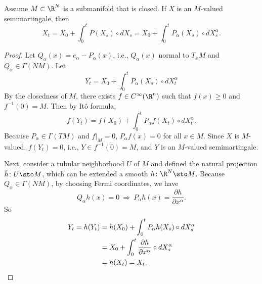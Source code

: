 \begin{lem}
    Assume $M \subset \R^N$ is a submanifold that is closed. If $X$ is an $M$-valued semimartingale, then
    \begin{equation*}
        X_t = X_0 + \int_0^t P(X_s) \circ dX_s = X_0 + \int_0^t P_\alpha(X_s) \circ dX^\alpha_s.
    \end{equation*}
\end{lem}
\begin{proof}
    Let $Q_\alpha(x) = e_\alpha - P_\alpha(x)$, i.e., $Q_\alpha(x)$ normal to $T_xM$ and $Q_\alpha \in \Gamma(NM)$. Let
    \begin{equation*}
        Y_t = X_0 + \int_0^t P_\alpha(X_s) \circ dX^\alpha_t
    \end{equation*}
    By the closedness of $M$, there exists $f \in C^\infty(\R^n)$ such that $f(x) \geq 0$ and $f^{-1}(0) = M$. Then by It\^o formula,
    \begin{equation*}
        f\left(Y_t\right)=f\left(X_0\right)+\int_0^t P_\alpha f\left(X_t\right) \circ d X_t^\alpha.
    \end{equation*}
    Because $P_\alpha \in \Gamma(TM)$ and $f|_M = 0$, $P_\alpha f(x) = 0$ for all $x \in M$. Since $X$ is $M$-valued, $f(Y_t) = 0$, i.e., $Y \in f^{-1}(0) = M$, and $Y$ is an $M$-valued semimartingale.

    Next, consider a tubular neighborhood $U$ of $M$ and defined the natural projection $\tilde{h} \colon U \sto M$, which can be extended a smooth $h \colon \R^N \sto M$. Because $Q_\alpha \in \Gamma(NM)$, by choosing Fermi coordinates, we have
    \begin{equation*}
        Q_\alpha h(x) = 0~\Rightarrow~ P_\alpha h(x) = \frac{\partial h}{\partial x^\alpha}.
    \end{equation*}
    So
    \begin{align*}
        Y_t = h(Y_t) &= h(X_0) + \int_0^t P_\alpha h(X_s) \circ dX_s^\alpha\\
        &= X_0 + \int_0^t \frac{\partial h}{\partial x^\alpha} \circ dX_s^\alpha\\
        &= h(X_t) = X_t. \qedhere
    \end{align*}
\end{proof}

